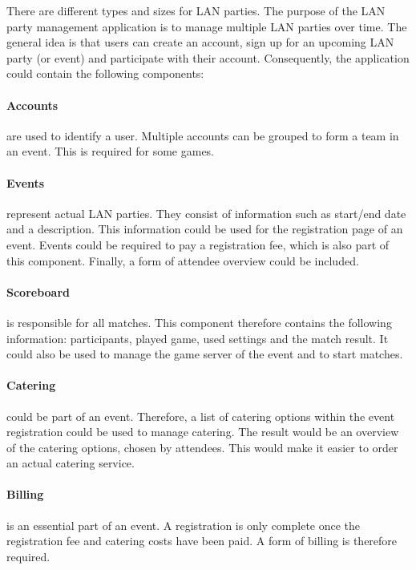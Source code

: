 

There are different types and sizes for \ac{LAN} parties.
The purpose of the \ac{LAN} party management application is to manage multiple \ac{LAN} parties over time.
The general idea is that users can create an account, sign up for an upcoming \ac{LAN} party (or event) and participate with their account.
Consequently, the application could contain the following components:

\paragraph{Accounts} are used to identify a user.
Multiple accounts can be grouped to form a team in an event.
This is required for some games.

\paragraph{Events} represent actual \ac{LAN} parties.
They consist of information such as start/end date and a description.
This information could be used for the registration page of an event.
Events could be required to pay a registration fee, which is also part of this component.
Finally, a form of attendee overview could be included.

\paragraph{Scoreboard} is responsible for all matches.
This component therefore contains the following information: participants, played game, used settings and the match result.
It could also be used to manage the game server of the event and to start matches.

\paragraph{Catering} could be part of an event.
Therefore, a list of catering options within the event registration could be used to manage catering.
The result would be an overview of the catering options, chosen by attendees.
This would make it easier to order an actual catering service.

\paragraph{Billing} is an essential part of an event.
A registration is only complete once the registration fee and catering costs have been paid.
A form of billing is therefore required.


